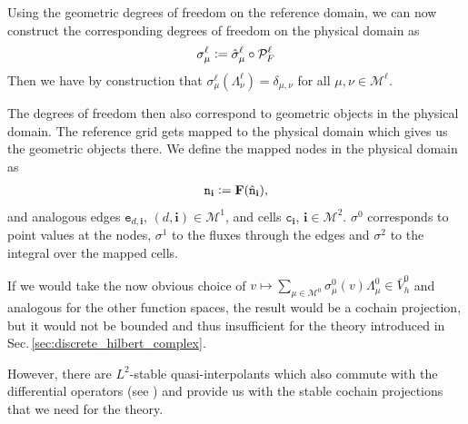 \documentclass[../master_thesis.tex]{subfiles}
\begin{document}
Using the geometric degrees of freedom on the reference domain, we can now construct the corresponding 
degrees of freedom on the physical domain as
\begin{align*}
    \sigma^\ell_\mu \vcentcolon= \hat{\sigma}_\mu^\ell \circ \mathcal{P}_F^\ell
\end{align*}
Then we have by construction that 
$\sigma^\ell_\mu(\Lambda^\ell_{\nu}) = \delta_{\mu,\nu}$ for all $\mu, \nu \in \mathcal{M}^\ell$.





The degrees of freedom then also correspond to geometric objects in the physical domain. 
The reference grid gets mapped to the physical domain which gives us the geometric objects there.
We define the mapped nodes in the physical domain as 
\begin{align*}
    \mathtt{n}_\mathbf{i} \vcentcolon= \mathbf{F}(\hat{\mathtt{n}}_\mathbf{i}), 
\end{align*}
and analogous edges $\mathtt{e}_{d,\mathbf{i}}$, $(d,\mathbf{i}) \in \mathcal{M}^1$, and 
cells $\mathtt{c}_\mathbf{i}$, $\mathbf{i} \in \mathcal{M}^2$.
$\sigma^0$ corresponds to point values at the nodes,
$\sigma^1$ to the fluxes through the edges and 
$\sigma^2$ to the integral over the mapped cells.

\begin{remark}
    If we would take the now obvious choice of $v \mapsto \sum_{\mu\in \mathcal{M}^0} \sigma^0_\mu(v) \Lambda^0_\mu 
    \in \bar{V}_h^0$ and analogous for the other function spaces,
    the result would be a cochain projection, but it would not be bounded and 
    thus insufficient for the theory introduced in Sec.\,{\ref{sec:discrete_hilbert_complex}}.

    However, there are $L^2$-stable quasi-interpolants which  
    also commute with the differential operators (see \cite[Sec.\,4]{buffa_rivas_sangalli}) and provide us 
    with the stable cochain projections that we need for the theory.
\end{remark}
\end{document}
